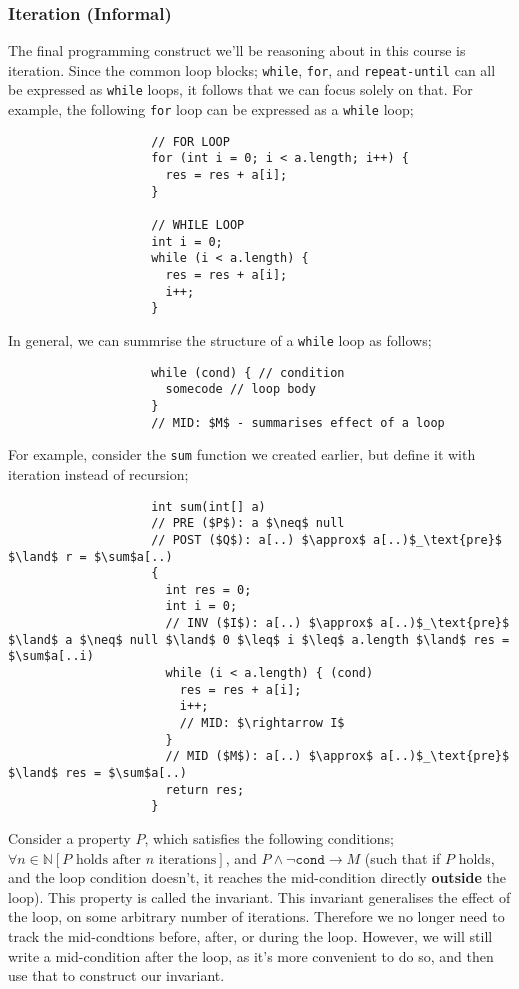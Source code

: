 \documentclass[a4paper, 12pt]{article}
\begin{document}
            \subsubsection*{Iteration (Informal)}
                The final programming construct we'll be reasoning about in this course is iteration. Since the common loop blocks; \texttt{while}, \texttt{for}, and \texttt{repeat-until} can all be expressed as \texttt{while} loops, it follows that we can focus solely on that. For example, the following \texttt{for} loop can be expressed as a \texttt{while} loop;
                \begin{lstlisting}
                    // FOR LOOP
                    for (int i = 0; i < a.length; i++) {
                      res = res + a[i];
                    }

                    // WHILE LOOP
                    int i = 0;
                    while (i < a.length) {
                      res = res + a[i];
                      i++;
                    }
                \end{lstlisting}
                In general, we can summrise the structure of a \texttt{while} loop as follows;
                \begin{lstlisting}
                    while (cond) { // condition
                      somecode // loop body
                    }
                    // MID: $M$ - summarises effect of a loop
                \end{lstlisting}
                For example, consider the \texttt{sum} function we created earlier, but define it with iteration instead of recursion;
                \begin{lstlisting}
                    int sum(int[] a)
                    // PRE ($P$): a $\neq$ null
                    // POST ($Q$): a[..) $\approx$ a[..)$_\text{pre}$ $\land$ r = $\sum$a[..)
                    {
                      int res = 0;
                      int i = 0;
                      // INV ($I$): a[..) $\approx$ a[..)$_\text{pre}$ $\land$ a $\neq$ null $\land$ 0 $\leq$ i $\leq$ a.length $\land$ res = $\sum$a[..i)
                      while (i < a.length) { (cond)
                        res = res + a[i];
                        i++;
                        // MID: $\rightarrow I$
                      }
                      // MID ($M$): a[..) $\approx$ a[..)$_\text{pre}$ $\land$ res = $\sum$a[..)
                      return res;
                    }
                \end{lstlisting}
                Consider a property $P$, which satisfies the following conditions; $\forall n \in \mathbb{N} [P \text{ holds after } n \text{ iterations}]$, and $P \land \neg\texttt{cond} \rightarrow M$ (such that if $P$ holds, and the loop condition doesn't, it reaches the mid-condition directly \textbf{outside} the loop). This property is called the invariant. This invariant generalises the effect of the loop, on some arbitrary number of iterations. Therefore we no longer need to track the mid-condtions before, after, or during the loop. However, we will still write a mid-condition after the loop, as it's more convenient to do so, and then use that to construct our invariant.
                \medskip
\end{document}
